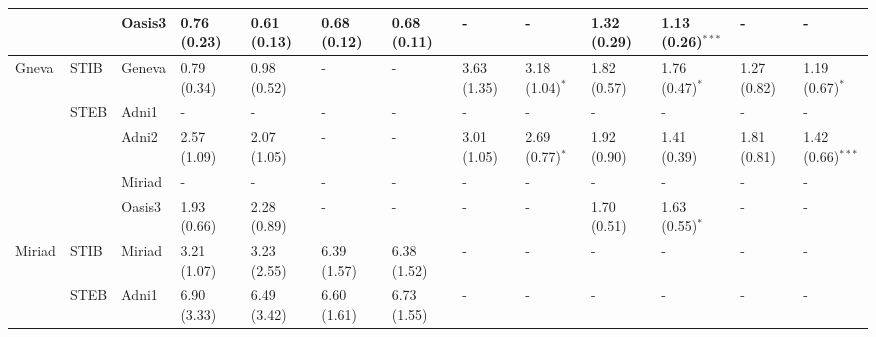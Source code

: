 \begin{table*}
{\begin{tabular}{lllllllllllll}
       &                 & Oasis3          &  0.76 (0.23) &  0.61 (0.13)       &  0.68 (0.12) &  0.68 (0.11)         &            - &            -         &  1.32 (0.29) &  1.13 (0.26)$^{***}$ &            - &            -         \\
\toprule
Gneva &          STIB    & Geneva          &  0.79 (0.34) &  0.98 (0.52)       &            - &            -         &  3.63 (1.35) &  3.18 (1.04)$^{*}$   &  1.82 (0.57) &  1.76 (0.47)$^{*}$   &  1.27 (0.82) &  1.19 (0.67)$^{*}$   \\
\cmidrule(lr){2-13}
       &         STEB  & Adni1           &            - &            -       &            - &            -         &            - &            -         &            - &            -         &            - &            -         \\
       &                 & Adni2           &  2.57 (1.09) &  2.07 (1.05)       &            - &            -         &  3.01 (1.05) &  2.69 (0.77)$^{*}$   &  1.92 (0.90) &  1.41 (0.39)         &  1.81 (0.81) &  1.42 (0.66)$^{***}$ \\
       &                 & Miriad          &            - &            -       &            - &            -         &            - &            -         &            - &            -         &            - &            -         \\
       &                 & Oasis3          &  1.93 (0.66) &  2.28 (0.89)       &            - &            -         &            - &            -         &  1.70 (0.51) &  1.63 (0.55)$^{*}$   &            - &            -         \\
\toprule
Miriad &          STIB   & Miriad          &  3.21 (1.07) &  3.23 (2.55)       &  6.39 (1.57) &  6.38 (1.52)         &            - &            -         &            - &            -         &            - &            -         \\
\cmidrule(lr){2-13}
       &          STEB  & Adni1           &  6.90 (3.33) &  6.49 (3.42)       &  6.60 (1.61) &  6.73 (1.55)         &            - &            -         &            - &            -         &            - &            -         \\

\end{tabular}}
\end{table*}
